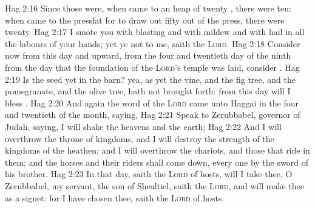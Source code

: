 \vs Hag 2:16 Since those  were, when  came to an heap of twenty , there were  ten: when  came to the pressfat for to draw out fifty  out of the press, there were  twenty.
\vs Hag 2:17 I smote you with blasting and with mildew and with hail in all the labours of your hands; yet ye  not to me, saith the \textsc{Lord}.
\vs Hag 2:18 Consider now from this day and upward, from the four and twentieth day of the ninth  from the day that the foundation of the \textsc{Lord's} temple was laid, consider .
\vs Hag 2:19 Is the seed yet in the barn? yea, as yet the vine, and the fig tree, and the pomegranate, and the olive tree, hath not brought forth: from this day will I bless .
\vs Hag 2:20 And again the word of the \textsc{Lord} came unto Haggai in the four and twentieth  of the month, saying,
\vs Hag 2:21 Speak to Zerubbabel, governor of Judah, saying, I will shake the heavens and the earth;
\vs Hag 2:22 And I will overthrow the throne of kingdoms, and I will destroy the strength of the kingdoms of the heathen; and I will overthrow the chariots, and those that ride in them; and the horses and their riders shall come down, every one by the sword of his brother.
\vs Hag 2:23 In that day, saith the \textsc{Lord} of hosts, will I take thee, O Zerubbabel, my servant, the son of Shealtiel, saith the \textsc{Lord}, and will make thee as a signet: for I have chosen thee, saith the \textsc{Lord} of hosts.
